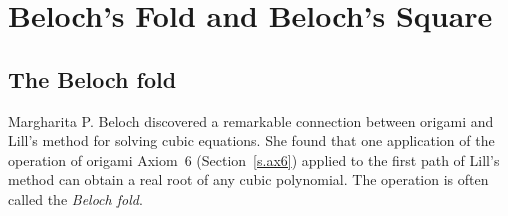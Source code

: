
\chapter{Beloch's Fold and Beloch's Square}\label{c.beloch}

\section{The Beloch fold}\label{s.beloch-fold}

Margharita P. Beloch discovered a remarkable connection between origami and Lill's method for solving cubic equations. She found that one application of the operation of origami Axiom~6 (Section~\ref{s.ax6}) applied to the first path of Lill's method can obtain a real root of any cubic polynomial. The operation is often called the \emph{Beloch fold}.

